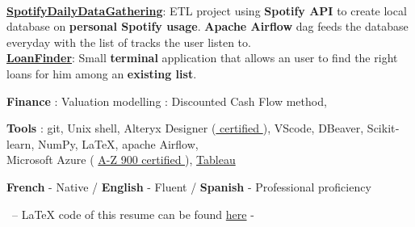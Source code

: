 \documentclass[10pt]{formatting/format} %
\begin{document}
\\
\textbf{\color{illustration}\href{https://github.com/DGloi/SpotifyDailyDataGathering}{SpotifyDailyDataGathering}\color{text}}: ETL project using \textbf{Spotify API} to create local database on \textbf{personal Spotify usage}. \textbf{Apache Airflow} dag feeds the database everyday with the list of tracks the user listen to. \\
\textbf{\color{illustration}\href{https://github.com/DGloi/LoanFinder}{LoanFinder}\color{text}}: Small \textbf{terminal} application that allows an user to find the right loans for him among an \textbf{existing list}.



\color{text}\textbf{Finance} :  Valuation modelling : Discounted Cash Flow method, 

\color{text}\textbf{Tools} : git, Unix shell, Alteryx Designer (\color{illustration}\href{https://www.credly.com/badges/27c8352c-3f58-4a94-aab6-0c3137eaafa4}{ certified }\color{text}), VScode, DBeaver,  Scikit‐learn, NumPy, LaTeX, apache Airflow, \\Microsoft Azure ( \color{illustration}\href{https://www.credly.com/badges/87cffde7-acf4-499b-8a3f-897d0a3ecd26}{A-Z 900 certified }\color{text} ), \color{illustration}\href{https://public.tableau.com/app/profile/gloinec}{Tableau}


\color{text}\textbf{French} - Native /
\color{text}\textbf{English} - Fluent /
\color{text}\textbf{Spanish} - Professional proficiency 
\\
\begin{center} 
\color{text}\footnotesize\ -- LaTeX code of this resume can be found \color{illustration}\href{https://github.com/DGloi/TexResumeTemplate}{here} \color{text} -\end{center}
\end{document}
